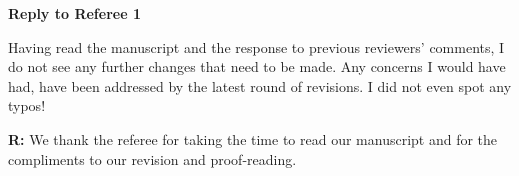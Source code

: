 \documentclass[12pt]{letter}
\newenvironment{refquote}{\bigskip \begin{it}}{\end{it}\smallskip}
\begin{document}











\clearpage

{\Large \bf Reply to Referee 1}

	\begin{refquote}
	Having read the manuscript and the response to previous reviewers’ comments, I do not see any further changes that need to be made. Any concerns I would have had, have been addressed by the latest round of revisions. I did not even spot any typos!
	\end{refquote}


	\textbf{R:} We thank the referee for taking the time to read our manuscript and for the compliments to our revision and proof-reading.
\end{document}
